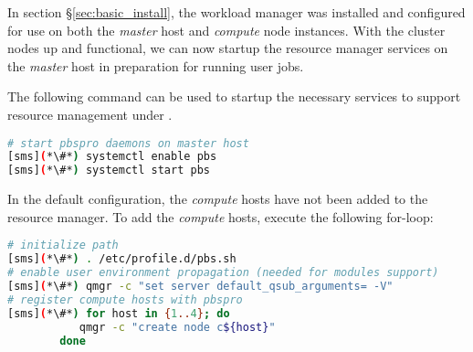 In section \S\ref{sec:basic_install}, the \rms{} workload manager was installed
and configured for use on both the {\em master} host and {\em compute} node
instances. With the cluster nodes up and functional, we can now startup the
resource manager services on the {\em master} host in preparation for running 
user jobs.

The following command can be used to startup the necessary services to support
resource management under \rms{}.

\begin{lstlisting}[language=bash,keywords={}]
# start pbspro daemons on master host
[sms](*\#*) systemctl enable pbs
[sms](*\#*) systemctl start pbs
\end{lstlisting}

In the default configuration, the {\em compute} hosts have not been added to 
the \rms{} resource manager. To add the {\em compute} hosts, execute 
the following for-loop:

\begin{lstlisting}[language=bash,keywords={}]
# initialize path
[sms](*\#*) . /etc/profile.d/pbs.sh
# enable user environment propagation (needed for modules support)
[sms](*\#*) qmgr -c "set server default_qsub_arguments= -V"
# register compute hosts with pbspro
[sms](*\#*) for host in {1..4}; do
           qmgr -c "create node c${host}"
        done
\end{lstlisting}
